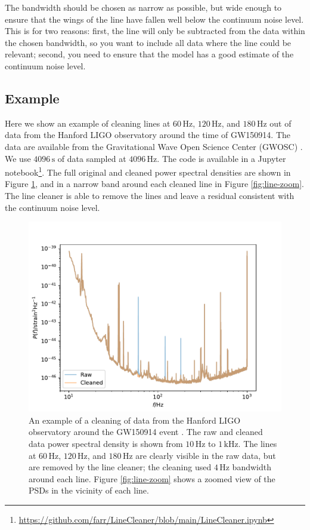 \documentclass[modern]{aastex631}
\begin{document}
The bandwidth should be chosen as narrow as possible, but wide enough to ensure
that the wings of the line have fallen well below the continuum noise level.
This is for two reasons: first, the line will only be subtracted from the data
within the chosen bandwidth, so you want to include all data where the line
could be relevant; second, you need to ensure that the model has a good estimate
of the continuum noise level.

\subsection{Example}

Here we show an example of cleaning lines at $60 \, \mathrm{Hz}$, $120 \,
\mathrm{Hz}$, and $180 \, \mathrm{Hz}$ out of data from the Hanford LIGO
observatory around the time of GW150914.  The data are available from the
Gravitational Wave Open Science Center (GWOSC)
\cite{GWOSC,GWOSC2,GW150914-GWOSC}.  We use $4096 \, \mathrm{s}$ of data sampled
at $4096 \, \mathrm{Hz}$.  The code is available in a Jupyter
notebook\footnote{\url{https://github.com/farr/LineCleaner/blob/main/LineCleaner.ipynb}}.
The full original and cleaned power spectral densities are shown in Figure
\ref{fig:cleaned-psd}, and in a narrow band around each cleaned line in Figure
\ref{fig:line-zoom}.  The line cleaner is able to remove the lines and leave a
residual consistent with the continuum noise level.

\begin{figure}
    \includegraphics[width=\columnwidth]{raw-and-cleaned-psd.pdf}
    \caption{\label{fig:cleaned-psd} An example of a cleaning of data from the
    Hanford LIGO observatory around the GW150914 event
    \cite{Abbott2016,Abbott2019,GWOSC,GWOSC2,GW150914-GWOSC}.  The raw and
    cleaned data power spectral density is shown from $10 \, \mathrm{Hz}$ to $1
    \, \mathrm{kHz}$.  The lines at $60 \, \mathrm{Hz}$, $120 \, \mathrm{Hz}$,
    and $180 \, \mathrm{Hz}$ are clearly visible in the raw data, but are
    removed by the line cleaner; the cleaning used $4 \, \mathrm{Hz}$ bandwidth
    around each line.  Figure \ref{fig:line-zoom} shows a zoomed view of the
    PSDs in the vicinity of each line.}
\end{figure}
\end{document}
